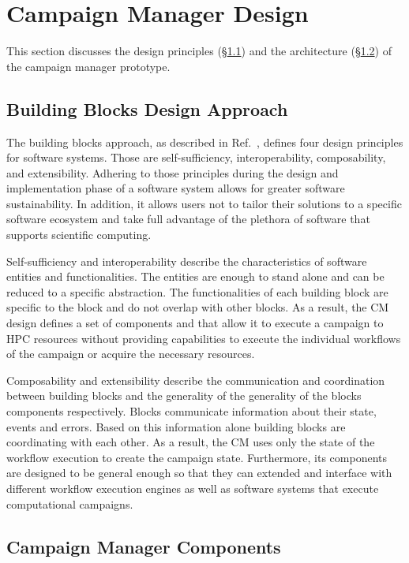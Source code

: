 \section{Campaign Manager Design}
\label{sec:cm_des}

This section discusses the design principles (\S\ref{ssec:building_blocks}) and
the architecture (\S\ref{ssec:cm_arch}) of the campaign manager prototype.

\subsection{Building Blocks Design Approach}
\label{ssec:building_blocks}

The building blocks approach, as described in Ref.~\cite{turilli2019middleware},
defines four design principles for software systems. Those are self-sufficiency,
interoperability, composability, and extensibility. Adhering to those principles
during the design and implementation phase of a software system allows for
greater software sustainability. In addition, it allows users not to tailor
their solutions to a specific software ecosystem and take full advantage of the
plethora of software that supports scientific computing.

Self-sufficiency and interoperability describe the characteristics of software
entities and functionalities. The entities are enough to stand alone and can
be reduced to a specific abstraction. The functionalities of each building
block are specific to the block and do not overlap with other blocks. As a
result, the CM design defines a set of components and that allow
it to execute a campaign to HPC resources without providing capabilities to
execute the individual workflows of the campaign or acquire the necessary
resources.

Composability and extensibility describe the communication and coordination
between building blocks and the generality of the generality of the blocks
components respectively. Blocks communicate information about their state,
events and errors. Based on this information alone building blocks are
coordinating with each other. As a result, the CM uses only the
state of the workflow execution to create the campaign state. Furthermore, its
components are designed to be general enough so that they can extended and
interface with different workflow execution engines as well as software
systems that execute computational campaigns.

\subsection{Campaign Manager Components}
\label{ssec:cm_arch}

